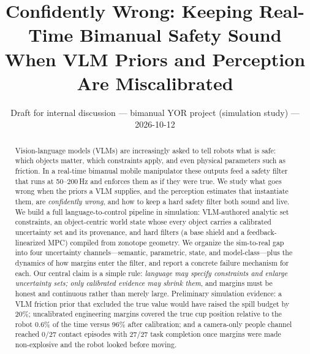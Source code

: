 \documentclass[10pt,twocolumn,letterpaper]{article}
\title{\vspace{-1.2em}\Large\bfseries Confidently Wrong: Keeping Real-Time Bimanual Safety Sound\\ When VLM Priors and Perception Are Miscalibrated}
\author{\normalsize Draft for internal discussion --- bimanual YOR project (simulation study) --- 2026-10-12}
\date{\vspace{-2.2em}}
\begin{document}
\maketitle

\begin{abstract}\noindent
Vision-language models (VLMs) are increasingly asked to tell robots what is safe: which objects matter, which constraints apply,
and even physical parameters such as friction. In a real-time bimanual mobile manipulator these outputs feed a safety filter that runs
at 50--200\,Hz and enforces them as if they were true. We study what goes wrong when the priors a VLM supplies, and the perception estimates
that instantiate them, are \emph{confidently wrong}, and how to keep a hard safety filter both sound and live. We build a full
language-to-control pipeline in simulation: VLM-authored analytic set constraints, an object-centric world state whose every object carries
a calibrated uncertainty set and its provenance, and hard filters (a base shield and a feedback-linearized MPC) compiled from zonotope
geometry. We organize the sim-to-real gap into four uncertainty channels---semantic, parametric, state, and model-class---plus the
dynamics of how margins enter the filter, and report a concrete failure mechanism for each. Our central claim is a simple rule:
\emph{language may specify constraints and enlarge uncertainty sets; only calibrated evidence may shrink them}, and margins must be honest
and continuous rather than merely large. Preliminary simulation evidence: a VLM friction prior that excluded the true value would have
raised the spill budget by 20\%; uncalibrated engineering margins covered the true cup position relative to the robot 0.6\% of the time versus 96\% after
calibration; and a camera-only people channel reached 0/27 contact episodes with 27/27 task completion once margins were made
non-explosive and the robot looked before moving.
\end{abstract}
\end{document}
